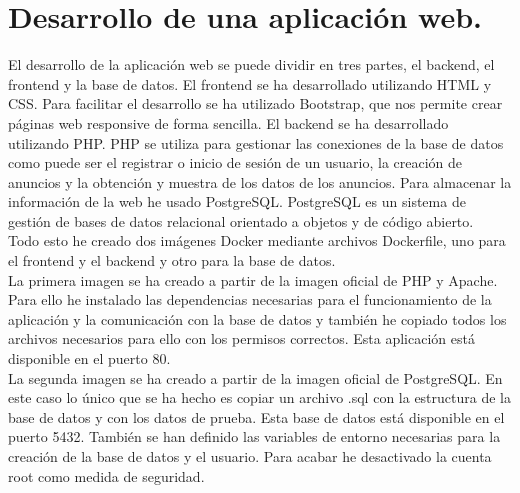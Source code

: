 \documentclass{report}
\begin{document}
        \section{Desarrollo de una aplicación web.}
            El desarrollo de la aplicación web se puede dividir en tres partes, el backend, el frontend y la base de datos.
            El frontend se ha desarrollado utilizando HTML y CSS.
            Para facilitar el desarrollo se ha utilizado Bootstrap, que nos permite crear páginas web responsive de forma sencilla.
            El backend se ha desarrollado utilizando PHP.
            PHP se utiliza para gestionar las conexiones de la base de datos como puede ser el registrar o inicio de sesión de un usuario, la creación de anuncios y la obtención y muestra de los datos de los anuncios.
            Para almacenar la información de la web he usado PostgreSQL.
            PostgreSQL es un sistema de gestión de bases de datos relacional orientado a objetos y de código abierto.\\

            Todo esto he creado dos imágenes Docker mediante archivos Dockerfile, uno para el frontend y el backend y otro para la base de datos.\\

            La primera imagen se ha creado a partir de la imagen oficial de PHP y Apache.
            Para ello he instalado las dependencias necesarias para el funcionamiento de la aplicación y la comunicación con la base de datos y también he copiado todos los archivos necesarios para ello con los permisos correctos.
            Esta aplicación está disponible en el puerto 80.\\

            La segunda imagen se ha creado a partir de la imagen oficial de PostgreSQL.
            En este caso lo único que se ha hecho es copiar un archivo .sql con la estructura de la base de datos y con los datos de prueba.
            Esta base de datos está disponible en el puerto 5432.
            También se han definido las variables de entorno necesarias para la creación de la base de datos y el usuario.
            Para acabar he desactivado la cuenta root como medida de seguridad.\\
        \clearpage
\end{document}
